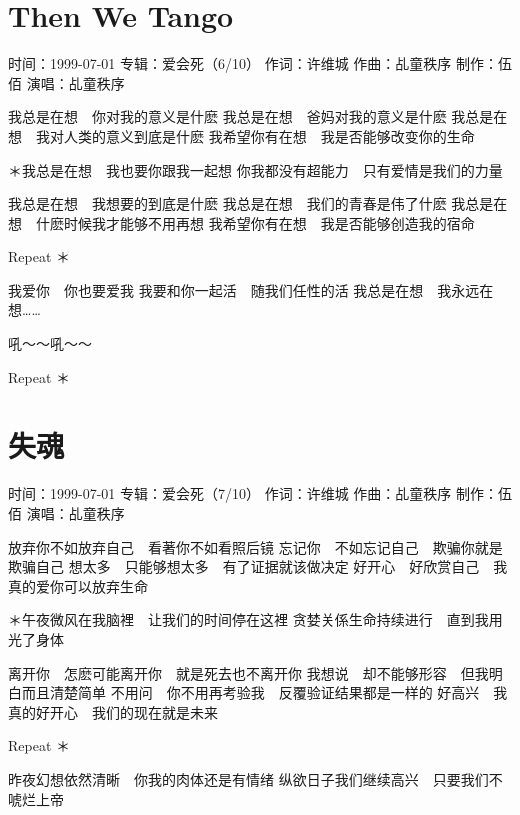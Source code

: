 \documentclass[UTF8,a4paper,oneside,twocolumn,12pt]{ctexbook}
\newcommand{\infopair}[2]{\textbullet #1：#2}
\newcommand{\zc}[1][伍佰]{\infopair{作词}{#1}}
\newcommand{\zq}[1][伍佰]{\infopair{作曲}{#1}}
\newcommand{\zj}[1]{\infopair{专辑}{#1}}
\newcommand{\zz}[1]{\infopair{制作}{#1}}
\newcommand{\sj}[1]{\infopair{时间}{#1}}
\newenvironment{info}{\begin{flushleft}\kaishu
	}
	{\end{flushleft}\normalsize\yahei\par}
\newenvironment{lyric}{
	}
{}
\begin{document}
\section{Then We Tango}
\begin{info}
	\sj{1999-07-01}
	\zj{爱会死（6/10）}
	\zc[许维城]
	\zq[乩童秩序]
	\zz{伍佰}
	\infopair{演唱}{乩童秩序}
\end{info}
\begin{lyric}
	我总是在想　你对我的意义是什麽
	我总是在想　爸妈对我的意义是什麽
	我总是在想　我对人类的意义到底是什麽
	我希望你有在想　我是否能够改变你的生命

	＊我总是在想　我也要你跟我一起想
	你我都没有超能力　只有爱情是我们的力量

	我总是在想　我想要的到底是什麽
	我总是在想　我们的青春是伟了什麽
	我总是在想　什麽时候我才能够不用再想
	我希望你有在想　我是否能够创造我的宿命

	Repeat ＊

	我爱你　你也要爱我
	我要和你一起活　随我们任性的活
	我总是在想　我永远在想……

	吼～～吼～～

	Repeat ＊
\end{lyric}

\section{失魂}
\begin{info}
	\sj{1999-07-01}
	\zj{爱会死（7/10）}
	\zc[许维城]
	\zq[乩童秩序]
	\zz{伍佰}
	\infopair{演唱}{乩童秩序}
\end{info}
\begin{lyric}
	放弃你不如放弃自己　看著你不如看照后镜
	忘记你　不如忘记自己　欺骗你就是欺骗自己
	想太多　只能够想太多　有了证据就该做决定
	好开心　好欣赏自己　我真的爱你可以放弃生命

	＊午夜微风在我脑裡　让我们的时间停在这裡
	贪婪关係生命持续进行　直到我用光了身体

	离开你　怎麽可能离开你　就是死去也不离开你
	我想说　却不能够形容　但我明白而且清楚简单
	不用问　你不用再考验我　反覆验证结果都是一样的
	好高兴　我真的好开心　我们的现在就是未来

	Repeat ＊

	昨夜幻想依然清晰　你我的肉体还是有情绪
	纵欲日子我们继续高兴　只要我们不唬烂上帝
\end{lyric}
\end{document}
